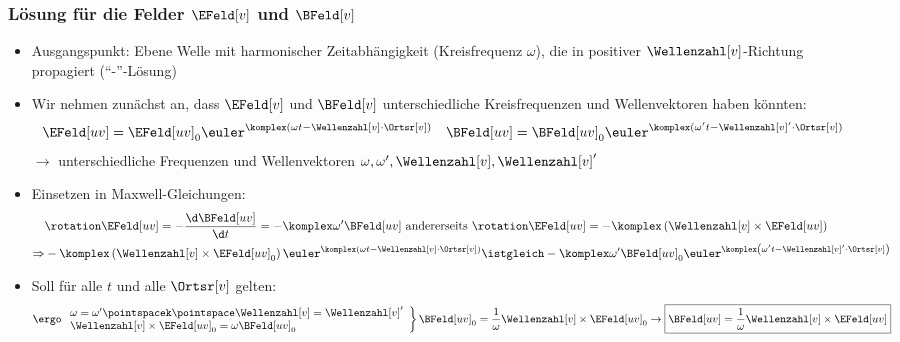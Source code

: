 \begin{frame}
  \frametitle{Lösung für die Felder \(\EFeld[v]\) und \(\BFeld[v]\)}
  \begin{itemize}[<+->]
  \item Ausgangspunkt: \alert{Ebene} Welle mit \alert{harmonischer} Zeitabhängigkeit (Kreisfrequenz \(\omega\)), die in \alert{positiver} \(\Wellenzahl[v]\)-Richtung propagiert (\enquote{-}-Lösung)
  \item Wir nehmen zunächst an, dass \(\EFeld[v]\) und \(\BFeld[v]\) unterschiedliche Kreisfrequenzen und Wellenvektoren haben könnten:
\begin{align*}
\EFeld[uv] &= \EFeld[uv]_0 \euler^{\komplex(\omega t - \Wellenzahl[v]\cdot\Ortsr[v])}& \BFeld[uv] &= \BFeld[uv]_0 \euler^{\komplex(\omega ' t - \Wellenzahl[v] \ensuremath{'}\cdot\Ortsr[v])}
\end{align*}
\(\rightarrow\) unterschiedliche Frequenzen und Wellenvektoren \(\omega, \omega', \Wellenzahl[v],\Wellenzahl[v]'\)
\item Einsetzen in Maxwell-Gleichungen:
\begin{align*}
&\rotation \EFeld[uv] = -\frac{\d \BFeld[uv]}{\d t}= -\komplex \omega ' \BFeld[uv] \text{ andererseits } \rotation \EFeld[uv] = -\komplex\left( \Wellenzahl[v] \times \EFeld[uv]\right)\\
\Rightarrow & -\komplex\left( \Wellenzahl[v] \times \EFeld[uv]_0 \right) \euler^{\komplex\left(\omega t - \Wellenzahl[v]\cdot\Ortsr[v]\right)} \istgleich -\komplex \omega' \BFeld[uv]_0 \euler^{\komplex \left(\omega' t -\Wellenzahl[v]'\cdot\Ortsr[v]\right)}
\end{align*}
\item Soll für alle \(t\) und alle \(\Ortsr[v]\) gelten:
\begin{align*}
  \ergo & \left. \begin{array}{l}
\omega = \omega'\pointspacek \pointspace \Wellenzahl[v] = \Wellenzahl[v]'\\
\Wellenzahl[v]\times\EFeld[uv]_0 = \omega\BFeld[uv]_0
                 \end{array}
\right\rbrace \BFeld[uv]_0 = \frac{1}{\omega} \Wellenzahl[v] \times\EFeld[uv]_0 \to \boxed{\BFeld[uv] = \frac{1}{\omega} \Wellenzahl[v] \times\EFeld[uv]}\\
\end{align*}
  \end{itemize}
\end{frame}



